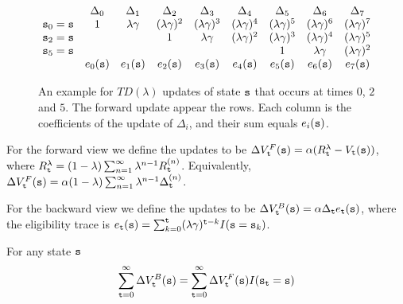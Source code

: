 \begin{figure}
    \centering
  $$  
  \begin{matrix}
                & \Delta_0 & \Delta_1 & \Delta_2 & \Delta_3 &  \Delta_4 & \Delta_5 & \Delta_6 & \Delta_7 \\
{\tt s}_0={\tt s} & 1 & \lambda\gamma & (\lambda\gamma)^2 & (\lambda\gamma)^3& (\lambda\gamma)^4 & (\lambda\gamma)^5& (\lambda\gamma)^6 &(\lambda\gamma)^7\\
{\tt s}_2={\tt s} &  & & 1 & \lambda\gamma & (\lambda\gamma)^2 & (\lambda\gamma)^3& (\lambda\gamma)^4  & (\lambda\gamma)^5\\
{\tt s}_5={\tt s} &  &  & & & & 1 & \lambda\gamma & (\lambda\gamma)^2\\
 & e_0({\tt s}) & e_1({\tt s}) & e_2({\tt s})& e_3({\tt s}) & e_4({\tt s}) & e_5({\tt s}) & e_6({\tt s}) & e_7({\tt s})
\end{matrix}
$$
    \caption{An example for $TD(\lambda)$ updates of state ${\tt s}$ that occurs at times $0$, $2$ and $5$. The forward update appear the rows. Each column is  the coefficients of the update of $\Delta_i$, and their sum equals $e_i({\tt s})$.} \label{fig-TD-lambda-forward-backward}
\end{figure}


For the forward view we define the updates to be
$\Delta V^F_{\tt t}({\tt s})=\alpha(R^\lambda_{\tt t}-V_{\tt t}({\tt s}))$,
where $R^\lambda_{\tt t}=(1-\lambda)\sum_{n=1}^\infty
\lambda^{n-1}R_{\tt t}^{(n)}$. Equivalently,
$\Delta V^F_{\tt t}({\tt s})=\alpha (1-\lambda)\sum_{n=1}^\infty \lambda^{n-1}\Delta_{\tt t} ^{(n)}$.


For the backward view we define the updates to be
$\Delta V^B_{\tt t}({\tt s})=\alpha\Delta_{\tt t} e_{\tt t}({\tt s})$,
where the eligibility trace is
$e_{\tt t}({\tt s})=\sum_{k=0}^{\tt t}(\lambda\gamma)^{{\tt t}-k}I({\tt s}={\tt s}_k)$.

\begin{theorem}
For any state ${\tt s}$
\[
\sum_{{\tt t}=0}^{\infty} \Delta V^B_{\tt t}
({\tt s})=\sum_{{\tt t}=0}^{\infty} \Delta V_{\tt t}^F({\tt s})
I({\tt s}_{\tt t}={\tt s})
\]
\end{theorem}

